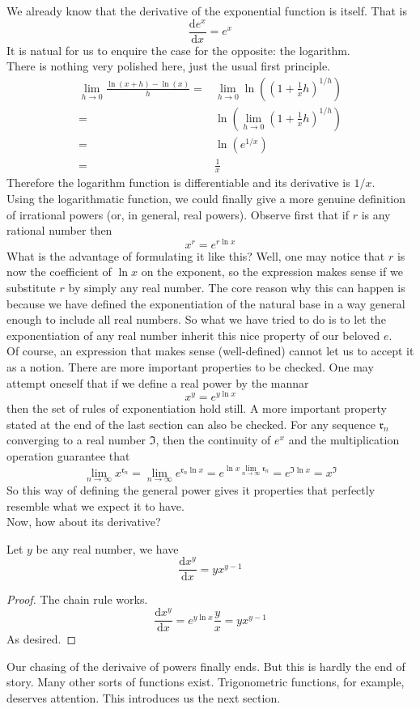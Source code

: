 We already know that the derivative of the exponential function is itself.
That is
$$\frac{\mathrm de^x}{\mathrm dx}=e^x$$
It is natual for us to enquire the case for the opposite: the logarithm.\\
There is nothing very polished here, just the usual first principle.
\begin{align*}
    \lim_{h\to0}\frac{\ln(x+h)-\ln(x)}{h}
    =&\lim_{h\to0}\ln\left(\left(1+\frac{1}{x}h\right)^{1/h}\right)\\
    =&\ln\left(\lim_{h\to0}\left(1+\frac{1}{x}h\right)^{1/h}\right)\\
    =&\ln(e^{1/x})\\
    =&\frac{1}{x}
\end{align*}
Therefore the logarithm function is differentiable and its derivative is $1/x$.\\
Using the logarithmatic function, we could finally give a more genuine definition of irrational powers (or, in general, real powers).
Observe first that if $r$ is any rational number then
$$x^r=e^{r\ln{x}}$$
What is the advantage of formulating it like this?
Well, one may notice that $r$ is now the coefficient of $\ln{x}$ on the exponent, so the expression makes sense if we substitute $r$ by simply any real number.
The core reason why this can happen is because we have defined the exponentiation of the natural base in a way general enough to include all real numbers.
So what we have tried to do is to let the exponentiation of any real number inherit this nice property of our beloved $e$.\\
Of course, an expression that makes sense (well-defined) cannot let us to accept it as a notion.
There are more important properties to be checked.
One may attempt oneself that if we define a real power by the mannar
$$x^y=e^{y\ln{x}}$$
then the set of rules of exponentiation hold still.
A more important property stated at the end of the last section can also be checked.
For any sequence $\mathfrak r_n$ converging to a real number $\mathfrak I$, then the continuity of $e^x$ and the multiplication operation guarantee that
$$\lim_{n\to\infty}x^{\mathfrak r_n}=\lim_{n\to\infty}e^{\mathfrak r_n\ln{x}}=e^{\ln{x}\lim_{n\to\infty}\mathfrak r_n}=e^{\mathfrak I\ln{x}}=x^{\mathfrak I}$$
So this way of defining the general power gives it properties that perfectly resemble what we expect it to have.\\
Now, how about its derivative?
\begin{theorem}
    Let $y$ be any real number, we have
    $$\frac{\mathrm dx^y}{\mathrm dx}=yx^{y-1}$$
\end{theorem}
\begin{proof}
    The chain rule works.
    $$\frac{\mathrm dx^y}{\mathrm dx}=e^{y\ln x}\frac{y}{x}=yx^{y-1}$$
    As desired.
\end{proof}
Our chasing of the derivaive of powers finally ends.
But this is hardly the end of story.
Many other sorts of functions exist.
Trigonometric functions, for example, deserves attention.
This introduces us the next section.